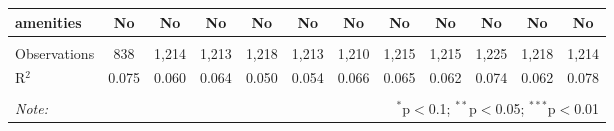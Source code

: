\begin{table}[!htbp]
\begin{tabular}{@{\extracolsep{5pt}}lccccccccccc}
amenities & No & No & No & No & No & No & No & No & No & No & No \\ 
\hline \\[-1.8ex] 
Observations & 838 & 1,214 & 1,213 & 1,218 & 1,213 & 1,210 & 1,215 & 1,215 & 1,225 & 1,218 & 1,214 \\ 
R$^{2}$ & 0.075 & 0.060 & 0.064 & 0.050 & 0.054 & 0.066 & 0.065 & 0.062 & 0.074 & 0.062 & 0.078 \\ 
\hline 
\hline \\[-1.8ex] 
\textit{Note:}  & \multicolumn{11}{r}{$^{*}$p$<$0.1; $^{**}$p$<$0.05; $^{***}$p$<$0.01} \\ 
\end{tabular} 
\end{table} 
